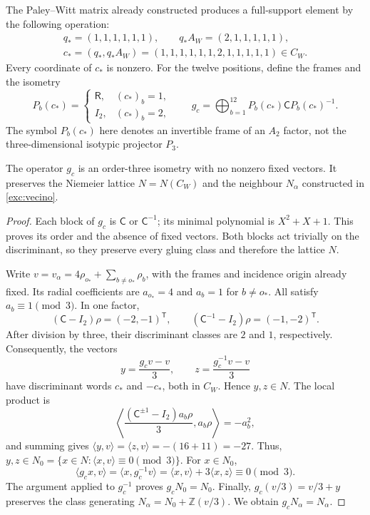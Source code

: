 The Paley--Witt matrix already constructed produces a full-support
element by the following operation:
\begin{equation}
 \begin{gathered}
 q_*=(1,1,1,1,1,1),\qquad q_*A_W=(2,1,1,1,1,1),\\
 c_*=(q_*,q_*A_W)
 =(1,1,1,1,1,1,2,1,1,1,1,1)\in C_W.
 \end{gathered}
 \label{km:palabra-total}
\end{equation}
Every coordinate of \(c_*\) is nonzero. For the twelve positions,
define the frames and the isometry
\begin{equation}
 P_b(c_*)=
 \begin{cases}\mathsf R,&(c_*)_b=1,\\I_2,&(c_*)_b=2,\end{cases}
 \qquad
 g_c=\bigoplus_{b=1}^{12}P_b(c_*)\mathsf C P_b(c_*)^{-1}.
 \label{km:isometria-ternaria}
\end{equation}
The symbol \(P_b(c_*)\) here denotes an invertible frame of an
\(A_2\) factor, not the three-dimensional isotypic projector \(P_3\).

\begin{proposition}
\label{km:estabilidad-vecino}
The operator \(g_c\) is an order-three isometry with no nonzero
fixed vectors. It preserves the Niemeier lattice \(N=N(C_W)\) and the
neighbour \(N_\alpha\) constructed in \eqref{exc:vecino}.
\end{proposition}
\begin{proof}
Each block of \(g_c\) is \(\mathsf C\) or \(\mathsf C^{-1}\);
its minimal polynomial is \(X^2+X+1\). This proves its order and
the absence of fixed vectors. Both blocks act trivially on the
discriminant, so they preserve every gluing class and therefore
the lattice \(N\).

Write \(v=v_\alpha=4\rho_{o_*}+\sum_{b\ne o_*}\rho_b\),
with the frames and incidence origin already fixed. Its radial
coefficients are \(a_{o_*}=4\) and \(a_b=1\) for \(b\ne o_*\).
All satisfy \(a_b\equiv1\pmod3\). In one factor,
\[
 (\mathsf C-I_2)\rho=(-2,-1)^{\mathsf T},\qquad
 (\mathsf C^{-1}-I_2)\rho=(-1,-2)^{\mathsf T}.
\]
After division by three, their discriminant classes are
\(2\) and \(1\), respectively. Consequently, the vectors
\begin{equation}
 y=\frac{g_cv-v}{3},\qquad z=\frac{g_c^{-1}v-v}{3}
 \label{km:desplazamientos}
\end{equation}
have discriminant words \(c_*\) and \(-c_*\), both in
\(C_W\). Hence \(y,z\in N\). The local product is
\[
 \left\langle
 \frac{(\mathsf C^{\pm1}-I_2)a_b\rho}{3},a_b\rho
 \right\rangle=-a_b^2,
\]
and summing gives
\(\langle y,v\rangle=\langle z,v\rangle=-(16+11)=-27\).
Thus, \(y,z\in N_0=\{x\in N:\langle x,v\rangle\equiv0\pmod3\}\).
For \(x\in N_0\),
\[
 \langle g_cx,v\rangle
 =\langle x,g_c^{-1}v\rangle
 =\langle x,v\rangle+3\langle x,z\rangle\equiv0\pmod3.
\]
The argument applied to \(g_c^{-1}\) proves \(g_cN_0=N_0\).
Finally, \(g_c(v/3)=v/3+y\) preserves the class generating
\(N_\alpha=N_0+\mathbb Z(v/3)\). We obtain
\(g_cN_\alpha=N_\alpha\).
\end{proof}


